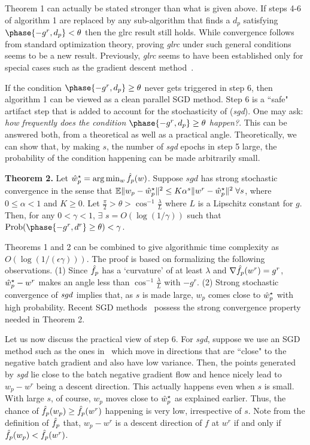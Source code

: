 \documentclass{article} %
\begin{document}
Theorem 1 can actually be stated stronger than what is given above. If steps 4-6 of algorithm 1 are replaced by any sub-algorithm that finds a $d_p$ satisfying $\phase{-g^r,d_p}<\theta$ then the glrc result still holds. While convergence follows from standard optimization theory, proving {\it glrc} under such general conditions seems to be a new result. Previously, {\it glrc} seems to have been established only for special cases such as the gradient descent method~\cite{boyd2004}.

If the condition $\phase{-g^r,d_p}\ge\theta$ never gets triggered in step 6, then algorithm 1 can be viewed as a clean parallel SGD method. Step 6 is a ``safe" artifact step that is added to account for the stochasticity of ({\it sgd}). One may ask: {\it how frequently does the condition $\phase{-g^r,d_p}\ge\theta$ happen?}. This can be answered both, from a theoretical as well as a practical angle. Theoretically, we can show that, by making $s$, the number of {\it sgd} epochs in step 5 large, the probability of the condition happening can be made arbitrarily small.

{\bf Theorem 2.} Let $\hat{w}_p^\star=\arg\min_w\hat{f}_p(w)$. Suppose $sgd$ has strong stochastic convergence in the sense that ${\mathbb E}\|w_p-\hat{w}_p^\star\|^2 \le K\alpha^s \|w^r-\hat{w}_p^\star\|^2\;\forall s$, where $0\le\alpha <1$ and $K\ge 0$. Let $\frac{\pi}{2} > \theta > \cos^{-1}\frac{\lambda}{L}$ where $L$ is a Lipschitz constant for $g$. Then, for any $0<\gamma<1$, $\exists$ $s=O(\log(1/\gamma))$ such that ${\rm Prob}(\phase{-g^r,d^r}\ge\theta)< \gamma$.

Theorems 1 and 2 can be combined to give algorithmic time complexity as $O(\log(1/(\epsilon\gamma)))$.
The proof is based on formalizing the following observations. (1) Since $\hat{f}_p$ has a `curvature' of at least $\lambda$ and $\nabla\hat{f}_p(w^r)=g^r$, $\hat{w}_p^\star-w^r$ makes an angle less than $\cos^{-1}\frac{\lambda}{L}$ with $-g^r$. (2) Strong stochastic convergence of ${\it sgd}$ implies that, as $s$ is made large, $w_p$ comes close to $\hat{w}_p^\star$ with high probability. Recent SGD methods~\cite{johnson2013, leroux2012} possess the strong convergence property needed in Theorem 2.

Let us now discuss the practical view of step 6. For {\it sgd}, suppose we use an SGD method such as the ones in~\cite{johnson2013, leroux2012} which move in directions that are ``close" to the negative batch gradient and also have low variance. Then, the points generated by {\it sgd} lie close to the batch negative gradient flow and hence nicely lead to $w_p-w^r$ being a descent direction. This actually happens even when $s$ is small. With large $s$, of course, $w_p$ moves close to $\hat{w}_p^\star$ as explained earlier. Thus, the chance of $\hat{f}_p(w_p)\ge\hat{f}_p(w^r)$ happening is very low, irrespective of $s$. Note from the definition of $\hat{f}_p$ that, $w_p-w^r$ is a descent direction of $f$ at $w^r$ if and only if $\hat{f}_p(w_p)<\hat{f}_p(w^r)$.
\end{document}
